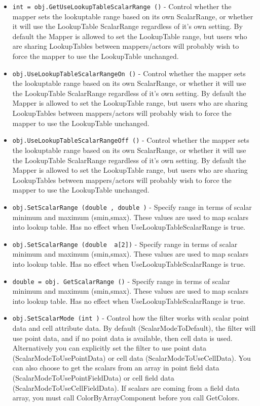 \begin{itemize}
\item  \verb|int = obj.GetUseLookupTableScalarRange ()| -  Control whether the mapper sets the lookuptable range based on its
 own ScalarRange, or whether it will use the LookupTable ScalarRange
 regardless of it's own setting. By default the Mapper is allowed to set
 the LookupTable range, but users who are sharing LookupTables between
 mappers/actors will probably wish to force the mapper to use the
 LookupTable unchanged.

\item  \verb|obj.UseLookupTableScalarRangeOn ()| -  Control whether the mapper sets the lookuptable range based on its
 own ScalarRange, or whether it will use the LookupTable ScalarRange
 regardless of it's own setting. By default the Mapper is allowed to set
 the LookupTable range, but users who are sharing LookupTables between
 mappers/actors will probably wish to force the mapper to use the
 LookupTable unchanged.

\item  \verb|obj.UseLookupTableScalarRangeOff ()| -  Control whether the mapper sets the lookuptable range based on its
 own ScalarRange, or whether it will use the LookupTable ScalarRange
 regardless of it's own setting. By default the Mapper is allowed to set
 the LookupTable range, but users who are sharing LookupTables between
 mappers/actors will probably wish to force the mapper to use the
 LookupTable unchanged.

\item  \verb|obj.SetScalarRange (double , double )| -  Specify range in terms of scalar minimum and maximum (smin,smax). These
 values are used to map scalars into lookup table. Has no effect when
 UseLookupTableScalarRange is true.

\item  \verb|obj.SetScalarRange (double  a[2])| -  Specify range in terms of scalar minimum and maximum (smin,smax). These
 values are used to map scalars into lookup table. Has no effect when
 UseLookupTableScalarRange is true.

\item  \verb|double = obj. GetScalarRange ()| -  Specify range in terms of scalar minimum and maximum (smin,smax). These
 values are used to map scalars into lookup table. Has no effect when
 UseLookupTableScalarRange is true.

\item  \verb|obj.SetScalarMode (int )| -  Control how the filter works with scalar point data and cell attribute
 data.  By default (ScalarModeToDefault), the filter will use point data,
 and if no point data is available, then cell data is used. Alternatively
 you can explicitly set the filter to use point data
 (ScalarModeToUsePointData) or cell data (ScalarModeToUseCellData).
 You can also choose to get the scalars from an array in point field
 data (ScalarModeToUsePointFieldData) or cell field data
 (ScalarModeToUseCellFieldData).  If scalars are coming from a field
 data array, you must call ColorByArrayComponent before you call
 GetColors.


\end{itemize}
